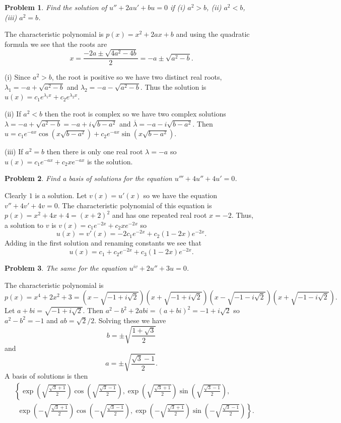 \documentclass{article}
\newtheorem{problem}{Problem}
\begin{document}
\begin{problem}
Find the solution of $u'' + 2au' + bu = 0$ if (i) $a^2 > b$, (ii) $a^2 < b$, (iii) $a^2 = b$.
\end{problem}

The characteristic polynomial is $p(x) = x^2 + 2ax + b$ and using the quadratic formula we see that the roots are
\[
x = \frac{-2a \pm \sqrt{4a^2 - 4b}}{2} = -a \pm \sqrt{a^2 - b}.
\]

(i) Since $a^2 > b$, the root is positive so we have two distinct real roots, $\lambda_1 = -a + \sqrt{a^2 - b}$ and $\lambda_2 = -a - \sqrt{a^2 - b}$. Thus the solution is $u(x) = c_1e^{\lambda_1 x} + c_2e^{\lambda_2 x}$.

(ii) If $a^2 < b$ then the root is complex so we have two complex solutions $\lambda = -a + \sqrt{a^2 - b} = -a + i \sqrt{b - a^2}$ and $\overline{\lambda} = -a - i \sqrt{b - a^2}$. Then $u = c_1e^{-a x} \cos(x\sqrt{b - a^2}) + c_2e^{-a x}\sin(x\sqrt{b - a^2})$.

(iii) If $a^2 = b$ then there is only one real root $\lambda = -a$ so $u(x) = c_1e^{-a x} + c_2xe^{-a x}$ is the solution.

\begin{problem}
Find a basis of solutions for the equation $u''' + 4u'' + 4u' = 0$.
\end{problem}

Clearly $1$ is a solution. Let $v(x) = u'(x)$ so we have the equation $v'' + 4v' + 4v = 0$. The characteristic polynomial of this equation is $p(x) = x^2 + 4x + 4 = (x+2)^2$ and has one repeated real root $x = -2$. Thus, a solution to $v$ is $v(x) = c_1e^{-2x} + c_2xe^{-2x}$ so
\[
u(x) = v'(x) = -2c_1e^{-2x} + c_2(1 - 2x)e^{-2x}.
\]
Adding in the first solution and renaming constants we see that
\[
u(x) = c_1 + c_2e^{-2x} + c_3(1-2x)e^{-2x}.
\]

\begin{problem}
The same for the equation $u^{iv} + 2u'' + 3u = 0$.
\end{problem}

The characteristic polynomial is
\[
p(x) = x^4 + 2x^2 + 3 = \left (x - \sqrt{-1 + i \sqrt{2}} \right ) \left (x + \sqrt{-1 + i \sqrt{2}} \right ) \left (x - \sqrt{-1 - i \sqrt{2}} \right ) \left (x + \sqrt{-1 - i \sqrt{2}} \right ).
\]
Let $a + bi = \sqrt{-1 + i \sqrt{2}}$. Then $a^2 - b^2 + 2abi = (a+bi)^2 = -1 + i \sqrt{2}$ so $a^2 - b^2 = -1$ and $ab = \sqrt{2}/2$. Solving these we have
\[
b = \pm \sqrt{ \frac{1 + \sqrt{3}}{2}}
\]
and
\[
a = \pm \sqrt{ \frac{\sqrt{3} - 1}{2}}.
\]
A basis of solutions is then
\begin{align*}
& \left \{ \exp \left ( \sqrt{ \frac{\sqrt{3} + 1}{2}} \right ) \cos \left ( \sqrt{ \frac{\sqrt{3} - 1}{2}} \right ), \exp \left ( \sqrt{ \frac{\sqrt{3} + 1}{2}} \right ) \sin \left ( \sqrt{ \frac{\sqrt{3} - 1}{2}} \right ), \right.\\
& ~~\left. \exp \left (- \sqrt{ \frac{\sqrt{3} + 1}{2}} \right ) \cos \left (- \sqrt{ \frac{\sqrt{3} - 1}{2}} \right ), \exp \left (- \sqrt{ \frac{\sqrt{3} + 1}{2}} \right ) \sin \left (- \sqrt{ \frac{\sqrt{3} - 1}{2}} \right ) \right \}.
\end{align*}
\end{document}
